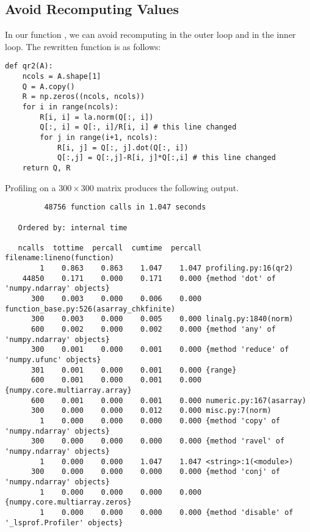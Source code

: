 \subsection*{Avoid Recomputing Values} %

In our function , we can avoid recomputing  in the outer
loop and  in the inner loop.
The rewritten function is as follows:
\begin{lstlisting}
def qr2(A):
    ncols = A.shape[1]
    Q = A.copy()
    R = np.zeros((ncols, ncols))
    for i in range(ncols):
        R[i, i] = la.norm(Q[:, i])
        Q[:, i] = Q[:, i]/R[i, i] # this line changed
        for j in range(i+1, ncols):
            R[i, j] = Q[:, j].dot(Q[:, i])
            Q[:,j] = Q[:,j]-R[i, j]*Q[:,i] # this line changed
    return Q, R
\end{lstlisting}

Profiling  on a $300 \times 300$ matrix produces the following output.

{\scriptsize
\begin{verbatim}
         48756 function calls in 1.047 seconds

   Ordered by: internal time

   ncalls  tottime  percall  cumtime  percall filename:lineno(function)
        1    0.863    0.863    1.047    1.047 profiling.py:16(qr2)
    44850    0.171    0.000    0.171    0.000 {method 'dot' of 'numpy.ndarray' objects}
      300    0.003    0.000    0.006    0.000 function_base.py:526(asarray_chkfinite)
      300    0.003    0.000    0.005    0.000 linalg.py:1840(norm)
      600    0.002    0.000    0.002    0.000 {method 'any' of 'numpy.ndarray' objects}
      300    0.001    0.000    0.001    0.000 {method 'reduce' of 'numpy.ufunc' objects}
      301    0.001    0.000    0.001    0.000 {range}
      600    0.001    0.000    0.001    0.000 {numpy.core.multiarray.array}
      600    0.001    0.000    0.001    0.000 numeric.py:167(asarray)
      300    0.000    0.000    0.012    0.000 misc.py:7(norm)
        1    0.000    0.000    0.000    0.000 {method 'copy' of 'numpy.ndarray' objects}
      300    0.000    0.000    0.000    0.000 {method 'ravel' of 'numpy.ndarray' objects}
        1    0.000    0.000    1.047    1.047 <string>:1(<module>)
      300    0.000    0.000    0.000    0.000 {method 'conj' of 'numpy.ndarray' objects}
        1    0.000    0.000    0.000    0.000 {numpy.core.multiarray.zeros}
        1    0.000    0.000    0.000    0.000 {method 'disable' of '_lsprof.Profiler' objects}
\end{verbatim}
}


